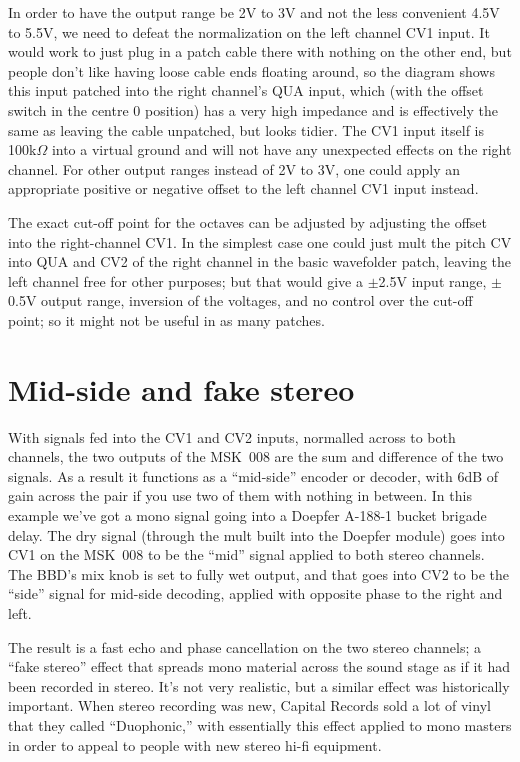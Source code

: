 In order to have the output range be 2V to 3V and not the less convenient
4.5V to 5.5V, we need to defeat the normalization on the left channel CV1
input.  It would work to just plug in a patch cable there with nothing on
the other end, but people don't like having loose cable ends floating
around, so the diagram shows this input patched into the right channel's QUA
input, which (with the offset switch in the centre 0 position) has a very
high impedance and is effectively the same as leaving the cable unpatched,
but looks tidier.  The CV1 input itself is 100k$\Omega$ into a
virtual ground and will not have any unexpected effects on the right
channel.  For other output ranges instead of 2V to 3V, one could apply an
appropriate positive or negative offset to the left channel CV1 input
instead.

The exact cut-off point for the octaves can be adjusted by adjusting the
offset into the right-channel CV1.  In the simplest case one could just mult
the pitch CV into QUA and CV2 of the right channel in the basic wavefolder
patch, leaving the left channel free for other purposes; but that would give
a $\pm$2.5V input range, $\pm$0.5V output range, inversion of the voltages,
and no control over the cut-off point; so it might not be useful in as many
patches.

\section{Mid-side and fake stereo}

With signals fed into the CV1 and CV2 inputs, normalled across to both
channels, the two outputs of the MSK~008 are the sum and difference of the
two signals.  As a result it functions as a ``mid-side'' encoder or decoder,
with 6dB of gain across the pair if you use two of them with nothing in
between.  In this example we've got a mono signal going into a Doepfer
A-188-1 bucket brigade delay.  The dry signal (through the mult built into
the Doepfer module) goes into CV1 on the MSK~008 to be the ``mid'' signal
applied to both stereo channels.  The BBD's mix knob is set to fully wet
output, and that goes into CV2 to be the ``side'' signal for mid-side
decoding, applied with opposite phase to the right and left.

The result is a fast echo and phase cancellation on the two stereo channels;
a ``fake stereo'' effect that spreads mono material across the sound stage
as if it had been recorded in stereo.  It's not very realistic, but a
similar effect was historically important.  When stereo recording was new,
Capital Records sold a lot of vinyl that they called ``Duophonic,'' with
essentially this effect applied to mono masters in order to appeal to people
with new stereo hi-fi equipment.

